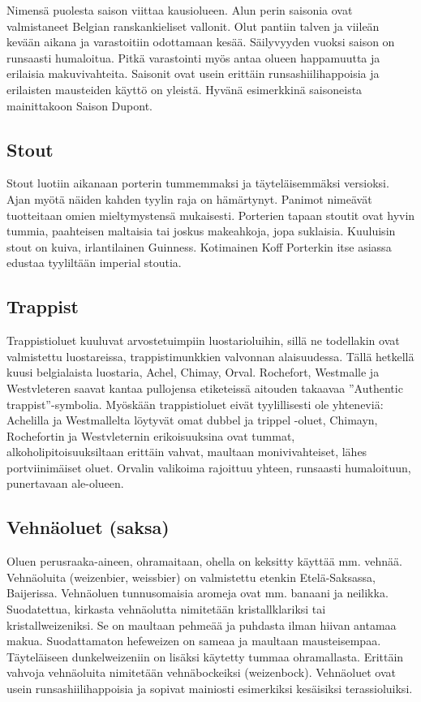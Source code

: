 \documentclass[a4paper,11pt]{report}
\begin{document}
Nimensä puolesta saison viittaa kausiolueen. Alun perin saisonia ovat valmistaneet Belgian ranskankieliset vallonit. Olut pantiin talven ja viileän kevään aikana ja varastoitiin odottamaan kesää. Säilyvyyden vuoksi saison on runsaasti humaloitua. Pitkä varastointi myös antaa olueen happamuutta ja erilaisia makuvivahteita. Saisonit ovat usein erittäin runsashiilihappoisia ja erilaisten mausteiden käyttö on yleistä. Hyvänä esimerkkinä saisoneista mainittakoon Saison Dupont.

\subsection*{Stout}

Stout luotiin aikanaan porterin tummemmaksi ja täyteläisemmäksi versioksi. Ajan myötä näiden kahden tyylin raja on hämärtynyt. Panimot nimeävät tuotteitaan omien mieltymystensä mukaisesti. Porterien tapaan stoutit ovat hyvin tummia, paahteisen maltaisia tai joskus makeahkoja, jopa suklaisia. Kuuluisin stout on kuiva, irlantilainen Guinness. Kotimainen Koff Porterkin itse asiassa edustaa tyyliltään imperial stoutia.

\subsection*{Trappist}

Trappistioluet kuuluvat arvostetuimpiin luostarioluihin, sillä ne todellakin ovat valmistettu luostareissa, trappistimunkkien valvonnan alaisuudessa. Tällä hetkellä kuusi belgialaista luostaria, Achel, Chimay, Orval. Rochefort, Westmalle ja Westvleteren saavat kantaa pullojensa etiketeissä aitouden takaavaa ''Authentic trappist''-symbolia. Myöskään trappistioluet eivät tyylillisesti ole yhteneviä: Achelilla ja Westmallelta löytyvät omat dubbel ja trippel -oluet, Chimayn, Rochefortin ja Westvleternin erikoisuuksina ovat tummat, alkoholipitoisuuksiltaan erittäin vahvat, maultaan monivivahteiset, lähes portviinimäiset oluet. Orvalin valikoima rajoittuu yhteen, runsaasti humaloituun, punertavaan ale-olueen.

\subsection*{Vehnäoluet (saksa)}

Oluen perusraaka-aineen, ohramaitaan, ohella on keksitty käyttää mm. vehnää. Vehnäoluita (weizenbier, weissbier) on valmistettu etenkin Etelä-Saksassa, Baijerissa. Vehnäoluen tunnusomaisia aromeja ovat mm. banaani ja neilikka. Suodatettua, kirkasta vehnäolutta nimitetään kristallklariksi tai kristallweizeniksi. Se on maultaan pehmeää ja puhdasta ilman hiivan antamaa makua. Suodattamaton hefeweizen on sameaa ja maultaan mausteisempaa. Täyteläiseen dunkelweizeniin on lisäksi käytetty tummaa ohramallasta. Erittäin vahvoja vehnäoluita nimitetään vehnäbockeiksi (weizenbock). Vehnäoluet ovat usein runsashiilihappoisia ja sopivat mainiosti esimerkiksi kesäisiksi terassioluiksi.
\end{document}
